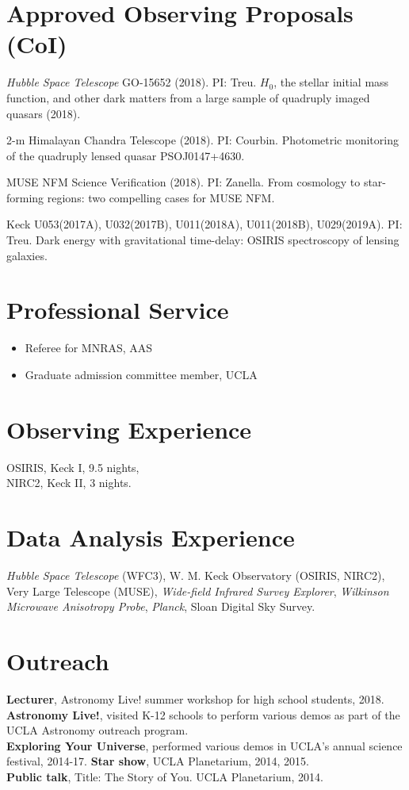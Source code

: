 \documentclass[margin,line]{res}
\begin{document}
\begin{resume}
\section{\sc Approved Observing Proposals (CoI)}
\begin{etaremune}
\item \textit{Hubble Space Telescope} GO-15652 (2018). PI: Treu. $H_0$, the stellar initial mass function, and other dark matters from a large sample of quadruply imaged quasars (2018).
\item 2-m Himalayan Chandra Telescope (2018). PI: Courbin. Photometric monitoring of the quadruply lensed quasar PSOJ0147+4630.
\item MUSE NFM Science Verification (2018). PI: Zanella. From cosmology to star-forming regions: two compelling cases for MUSE NFM.
\item Keck U053(2017A), U032(2017B), U011(2018A),  U011(2018B), U029(2019A). PI: Treu. Dark energy with gravitational time-delay: OSIRIS spectroscopy of lensing galaxies.
\end{etaremune}

\section{\sc Professional Service}
\begin{itemize}
\item Referee for MNRAS, AAS
\item Graduate admission committee member, UCLA
\end{itemize}


\section{\sc Observing Experience}
OSIRIS, Keck I, 9.5 nights,\\
NIRC2, Keck II, 3 nights. 


\section{\sc Data Analysis Experience}
\textit{Hubble Space Telescope} (WFC3), 
W. M. Keck Observatory (OSIRIS, NIRC2),
Very Large Telescope (MUSE),
{\it Wide-field Infrared Survey Explorer},
{\it Wilkinson Microwave Anisotropy Probe},
{\it Planck},
Sloan Digital Sky Survey.


\section{\sc Outreach}
{\bf Lecturer}, Astronomy Live! summer workshop for high school students, 2018. \\
{\bf Astronomy Live!}, visited K-12 schools to perform various demos as part of the UCLA Astronomy outreach program. \\
{\bf Exploring Your Universe}, performed various demos in UCLA's annual science festival, 2014-17.
{\bf Star show}, UCLA Planetarium, 2014, 2015. \\
{\bf Public talk}, Title: The Story of You. UCLA Planetarium, 2014. \\


\end{resume}
\end{document}
